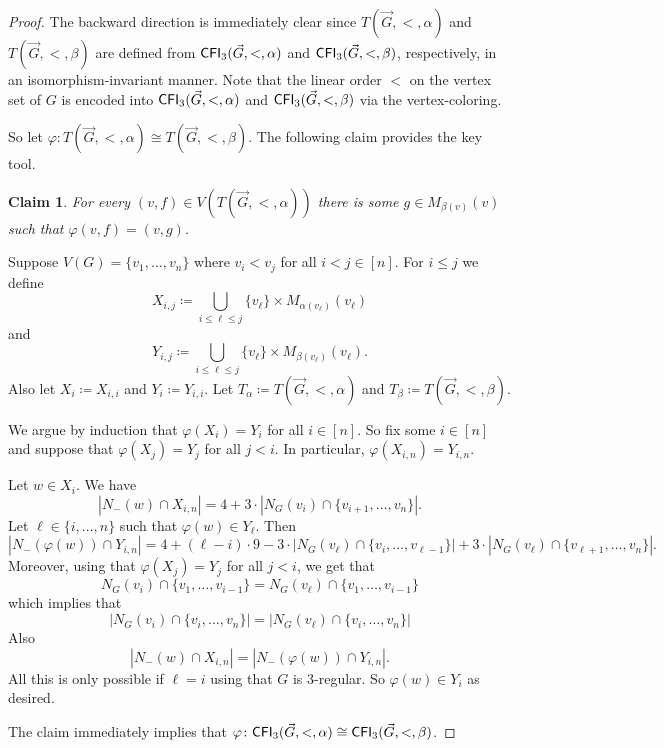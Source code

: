 \PassOptionsToPackage{dvipsnames,svgnames}{xcolor}\documentclass[10pt,a4paper]{article}
\newtheorem{claim}{Claim}[section]
\newcommand{\CFI}{{\sf CFI}}
\begin{document}
\begin{proof}
 The backward direction is immediately clear since $T(\vec{G},<,\alpha)$ and $T(\vec{G},<,\beta)$ are defined from $\CFI_3(\vec{G},<,\alpha)$ and $\CFI_3(\vec{G},<,\beta)$, respectively, in an isomorphism-invariant manner.
 Note that the linear order $<$ on the vertex set of $G$ is encoded into $\CFI_3(\vec{G},<,\alpha)$ and $\CFI_3(\vec{G},<,\beta)$ via the vertex-coloring.

 So let $\varphi\colon T(\vec{G},<,\alpha) \cong T(\vec{G},<,\beta)$.
 The following claim provides the key tool.

 \begin{claim}
  For every $(v,f) \in V(T(\vec{G},<,\alpha))$ there is some $g \in M_{\beta(v)}(v)$ such that $\varphi(v,f) = (v,g)$.
 \end{claim}
 \begin{subproof}
  Suppose $V(G) = \{v_1,\dots,v_n\}$ where $v_i < v_j$ for all $i < j \in [n]$.
  For $i \leq j$ we define
  \[X_{i,j} \coloneqq \bigcup_{i \leq \ell \leq j} \{v_\ell\} \times M_{\alpha(v_\ell)}(v_\ell)\]
  and
  \[Y_{i,j} \coloneqq \bigcup_{i \leq \ell \leq j} \{v_\ell\} \times M_{\beta(v_\ell)}(v_\ell).\]
  Also let $X_i \coloneqq X_{i,i}$ and $Y_i \coloneqq Y_{i,i}$.
  Let $T_\alpha \coloneqq T(\vec{G},<,\alpha)$ and $T_\beta \coloneqq T(\vec{G},<,\beta)$.

  We argue by induction that $\varphi(X_i) = Y_i$ for all $i \in [n]$.
  So fix some $i \in [n]$ and suppose that $\varphi(X_j) = Y_j$ for all $j < i$.
  In particular, $\varphi(X_{i,n}) = Y_{i,n}$.

  Let $w \in X_i$.
  We have
  \[|N_-(w) \cap X_{i,n}| = 4 + 3 \cdot |N_G(v_i) \cap \{v_{i+1},\dots,v_n\}|.\]
  Let $\ell \in \{i,\dots,n\}$ such that $\varphi(w) \in Y_\ell$.
  Then
  \[|N_-(\varphi(w)) \cap Y_{i,n}| = 4 + (\ell - i) \cdot 9 - 3 \cdot |N_G(v_\ell) \cap \{v_{i},\dots,v_{\ell-1}\}| +  3 \cdot |N_G(v_\ell) \cap \{v_{\ell+1},\dots,v_n\}|.\]
  Moreover, using that $\varphi(X_j) = Y_j$ for all $j < i$, we get that
  \[N_G(v_i) \cap \{v_1,\dots,v_{i-1}\} = N_G(v_\ell) \cap \{v_1,\dots,v_{i-1}\}\]
  which implies that
  \[|N_G(v_i) \cap \{v_i,\dots,v_n\}| = |N_G(v_\ell) \cap \{v_i,\dots,v_n\}|\]
  Also
  \[|N_-(w) \cap X_{i,n}| = |N_-(\varphi(w)) \cap Y_{i,n}|.\]
  All this is only possible if $\ell = i$ using that $G$ is $3$-regular.
  So $\varphi(w) \in Y_i$ as desired.
 \end{subproof}

 The claim immediately implies that $\varphi\colon\CFI_3(\vec{G},<,\alpha) \cong \CFI_3(\vec{G},<,\beta)$.
\end{proof}
\end{document}
